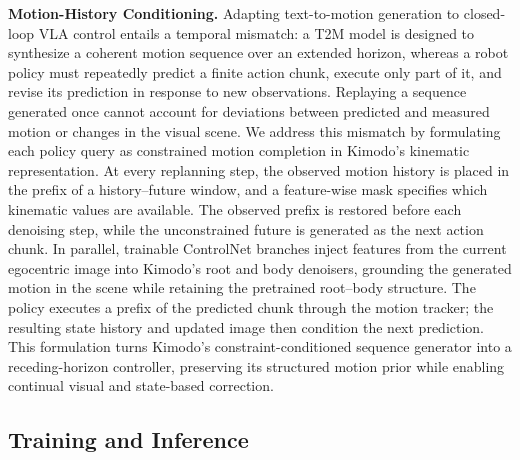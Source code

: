 \textbf{Motion-History Conditioning.} Adapting text-to-motion generation to closed-loop VLA control entails a temporal mismatch: a T2M model is designed to synthesize a coherent motion sequence over an extended horizon, whereas a robot policy must repeatedly predict a finite action chunk, execute only part of it, and revise its prediction in response to new observations. Replaying a sequence generated once cannot account for deviations between predicted and measured motion or changes in the visual scene. We address this mismatch by formulating each policy query as constrained motion completion in Kimodo's kinematic representation. At every replanning step, the observed motion history is placed in the prefix of a history--future window, and a feature-wise mask specifies which kinematic values are available. The observed prefix is restored before each denoising step, while the unconstrained future is generated as the next action chunk. In parallel, trainable ControlNet branches inject features from the current egocentric image into Kimodo's root and body denoisers, grounding the generated motion in the scene while retaining the pretrained root--body structure. The policy executes a prefix of the predicted chunk through the motion tracker; the resulting state history and updated image then condition the next prediction. This formulation turns Kimodo's constraint-conditioned sequence generator into a receding-horizon controller, preserving its structured motion prior while enabling continual visual and state-based correction.

\subsection{Training and Inference}
\label{sec:training_inference}

